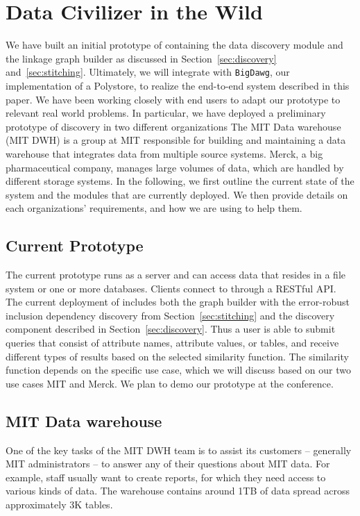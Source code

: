 \section{Data Civilizer in the Wild}
\label{sec:wild}

We have built an initial prototype of \dcv containing the data discovery module
and the linkage graph builder as discussed in Section~\ref{sec:discovery} and~\ref{sec:stitching}. Ultimately, we will integrate \dcv with
\texttt{BigDawg}, our implementation of a Polystore, to realize the end-to-end
system described in this paper.  We have been working closely with end users to
adapt our prototype to relevant real world problems.  In particular, we have deployed
a preliminary prototype of discovery in two different organizations The MIT Data
warehouse (MIT DWH) is a group at MIT responsible for building and maintaining a
data warehouse that integrates data from multiple source systems. Merck, a big
pharmaceutical company, manages large volumes of data, which are handled by
different storage systems.  In the following, we first outline the current state
of the system and the modules that are currently deployed.  We then provide
details on each organizations' requirements, and how we are using \dcv to help
them.

\subsection{Current \titledcv Prototype} The current prototype runs as a
server and can access data that resides in a file system or one or more
databases.  Clients  connect to \dcv through a RESTful API.  The current
deployment of \dcv  includes both  the graph builder with the error-robust
inclusion dependency discovery from Section~\ref{sec:stitching} and the
discovery component described in Section~\ref{sec:discovery}.  Thus a user is
able to submit queries that consist of attribute names, attribute values, or
tables, and receive different types of results based on the selected
similarity function. The similarity function depends on the specific use case,
which we will discuss based on our two use cases MIT and Merck.  We plan to
demo our \dcv prototype at the conference.

\subsection{MIT Data warehouse}

One of the key tasks of the MIT DWH team is to assist its customers --
generally MIT administrators -- to answer any of their questions about MIT
data. For example, staff usually want to create reports, for which they need
access to various kinds of data. The warehouse contains around 1TB of data
spread across approximately 3K tables.

